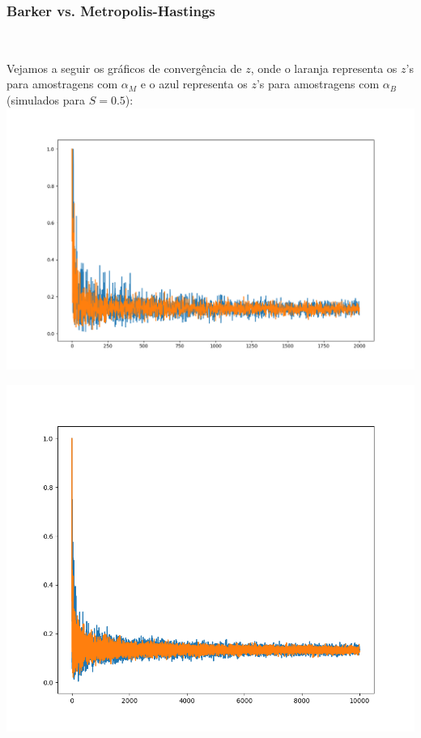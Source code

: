\documentclass[pt12]{article}
\begin{document}
\subsubsection{Barker vs. Metropolis-Hastings}
\ 

Vejamos a seguir os gráficos de convergência de $z$, onde o laranja representa os $z$'s para amostragens com $\alpha_M$ e o azul representa os $z$'s para amostragens com $\alpha_B$ (simulados para $S = 0.5$):\\

\includegraphics[scale=0.5]{ConvergZ_M(lar)vsB(azl).png}

\includegraphics[scale=0.65]{ConvergZ_M(lar)vsB(azl)_10000.png}
\newpage
\end{document}
